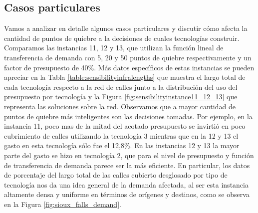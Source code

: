 \subsection*{Casos particulares}

Vamos a analizar en detalle algunos casos particulares y discutir cómo afecta la cantidad de puntos de quiebre a la decisiones de cuales tecnologías construir. Comparamos las instancias 11, 12 y 13, que utilizan la función lineal de transferencia de demanda con 5, 20 y 50 puntos de quiebre respectivamente y un factor de presupuesto de 40\%. Más datos específicos de estas instancias se pueden apreciar en la Tabla \ref{table:sensibilityinfralengths} que muestra el largo total de cada tecnología respecto a la red de calles junto a la distribución del uso del presupuesto por tecnología y la Figura \ref{fig:sensibilityinstance11_12_13} que representa las soluciones sobre la red. Observamos que a mayor cantidad de puntos de quiebre más inteligentes son las decisiones tomadas. Por ejemplo, en la instancia 11, poco mas de la mitad del acotado presupuesto se invirtió en poco cubrimiento de calles utilizando la tecnología 3 mientras que en la 12 y 13 el gasto en esta tecnología sólo fue el 12,8\%. En las instancias 12 y 13 la mayor parte del gasto se hizo en tecnología 2, que para el nivel de presupuesto y función de transferencia de demanda parece ser la más eficiente. En particular, los datos de porcentaje del largo total de las calles cubierto desglosado por tipo de tecnología nos da una idea general de la demanda afectada, al ser esta instancia altamente densa y uniforme en términos de orígenes y destinos, como se observa en la Figura \ref{fig:sioux_falls_demand}.

